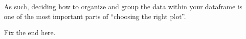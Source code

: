 As such, deciding how to organize and group the data within your dataframe is one of the most important parts of ``choosing the right plot''.

Fix the end here.